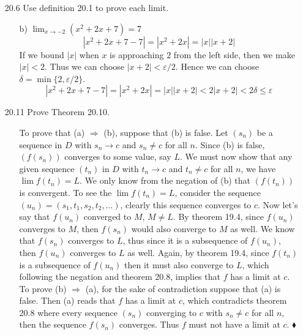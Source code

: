 \documentclass[12pt]{article}
\begin{document}
\begin{enumerate}
\item[20.6] Use definition 20.1 to prove each limit.
\begin{enumerate}
\item[b)] $\lim_{x \rightarrow -2}(x^2 + 2x + 7) = 7$
\[
|x^2 + 2x + 7 - 7 | = |x^2 + 2x| = |x||x + 2|
\]
If we bound $|x|$ when $x$ is approaching $2$ from the left side, then we make
$|x| < 2$. Thus we can choose $|x + 2| < \varepsilon /2$. Hence we can choose 
$\delta = \min\{2, \varepsilon /2 \}$.
\[
|x^2 + 2x + 7 - 7 | = |x^2 + 2x| = |x||x + 2| < 2|x + 2| < 2\delta \leq \varepsilon
\]
\end{enumerate}

\item[20.11] Prove Theorem 20.10.
\begin{enumerate}
\item[] To prove that (a) $\Rightarrow$ (b), suppose that (b) is false. Let $(s_n)$ be a sequence
in $D$ with $s_n \rightarrow c$ and $s_n \neq c$ for all $n$. Since (b) is false, $(f(s_n))$ 
converges to some value, say $L$. We must now show that any given sequence $(t_n)$ in $D$ with
$t_n \rightarrow c$ and $t_n \neq c$ for all $n$, we have $\lim f(t_n) = L$. We only know from the
negation of (b) that $(f(t_n))$ is convergent. To see the $\lim f(t_n) = L$, consider the sequence
$(u_n) = (s_1, t_1, s_2, t_2, \ldots )$, clearly this sequence converges to $c$. Now let's say
that $f(u_n)$ converged to $M$, $M \neq L$. By theorem 19.4, since $f(u_n)$ converges to 
$M$, then $f(s_n)$ would also converge to $M$ as well. We know that $f(s_n)$ converges to $L$, thus
since it is a subsequence of $f(u_n)$, then $f(u_n)$ converges to $L$ as well. Again, by 
theorem 19.4, since $f(t_n)$ is a subsequence of $f(u_n)$ then it must also converge to $L$,
which following the negation and theorem 20.8, implies that $f$ has a limit at $c$. To prove
(b) $\Rightarrow$ (a), for the sake of contradiction suppose that (a) is false. Then (a) reads
that $f$ has a limit at $c$, which contradicts theorem 20.8 where every sequence $(s_n)$ converging
to $c$ with $s_n \neq c$ for all $n$, then the sequence $f(s_n)$ converges. Thus $f$ must not
have a limit at $c$. $\blacklozenge$
\end{enumerate}


\end{enumerate}
\end{document}
